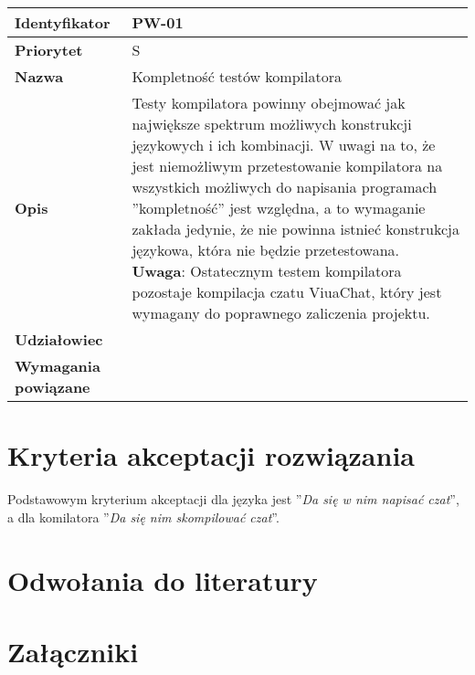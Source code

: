 \documentclass[11pt,oneside,a4paper,titlepage,onecolumn]{article}
\begin{document}
\vspace{1em}

\begin{tabular}{ | l | l | }
    \hline
    \textbf{Identyfikator} & \parbox[t]{11cm}{PW-01} \\
    \hline
    \textbf{Priorytet} & S \\
    \hline
    \textbf{Nazwa} & Kompletność testów kompilatora \\
    \hline
    \textbf{Opis} & \parbox[t]{11cm}{
        Testy kompilatora powinny obejmować jak największe spektrum możliwych konstrukcji językowych i
        ich kombinacji. W uwagi na to, że jest niemożliwym przetestowanie kompilatora na wszystkich
        możliwych do napisania programach ''kompletność'' jest względna, a to wymaganie zakłada jedynie, że
        nie powinna istnieć konstrukcja językowa, która nie będzie przetestowana. \\
        \textbf{Uwaga}: Ostatecznym testem kompilatora pozostaje kompilacja czatu ViuaChat, który jest
        wymagany do poprawnego zaliczenia projektu.
    } \\
    \hline
    \textbf{Udziałowiec} & \phantom{} \\
    \hline
    \textbf{Wymagania powiązane} & \phantom{} \\
    \hline
\end{tabular}

\section{Kryteria akceptacji rozwiązania}

Podstawowym kryterium akceptacji dla języka jest ''\emph{Da się w nim napisać czat}'', a
dla komilatora ''\emph{Da się nim skompilować czat}''.

\section{Odwołania do literatury}

\section{Załączniki}
\end{document}
